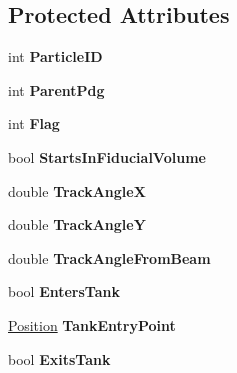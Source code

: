 \subsection*{Protected Attributes}
\begin{DoxyCompactItemize}
\item 
\hypertarget{classMCParticle_a52ca5b486dd9ded3b7da2b77c2704f85}{
int {\bfseries ParticleID}}
\label{classMCParticle_a52ca5b486dd9ded3b7da2b77c2704f85}

\item 
\hypertarget{classMCParticle_aa60d9c88e4c168be89a8075414078e82}{
int {\bfseries ParentPdg}}
\label{classMCParticle_aa60d9c88e4c168be89a8075414078e82}

\item 
\hypertarget{classMCParticle_a74ff96a2e3f2c92d991a631dc320b343}{
int {\bfseries Flag}}
\label{classMCParticle_a74ff96a2e3f2c92d991a631dc320b343}

\item 
\hypertarget{classMCParticle_a9328c826d1ee1d615e312d25235d04a0}{
bool {\bfseries StartsInFiducialVolume}}
\label{classMCParticle_a9328c826d1ee1d615e312d25235d04a0}

\item 
\hypertarget{classMCParticle_aafb0416bfa7dfcaa14f4243d76930239}{
double {\bfseries TrackAngleX}}
\label{classMCParticle_aafb0416bfa7dfcaa14f4243d76930239}

\item 
\hypertarget{classMCParticle_aaf4a5cd3469f3d527c0ac8f4e3713c4b}{
double {\bfseries TrackAngleY}}
\label{classMCParticle_aaf4a5cd3469f3d527c0ac8f4e3713c4b}

\item 
\hypertarget{classMCParticle_af4cdfb96769ec1a40e45c4f40b9eb520}{
double {\bfseries TrackAngleFromBeam}}
\label{classMCParticle_af4cdfb96769ec1a40e45c4f40b9eb520}

\item 
\hypertarget{classMCParticle_afc38d81f454f0011d513db8dedc39d37}{
bool {\bfseries EntersTank}}
\label{classMCParticle_afc38d81f454f0011d513db8dedc39d37}

\item 
\hypertarget{classMCParticle_ad1c64ca6b80955ea88cc1014360c53fa}{
\hyperlink{classPosition}{Position} {\bfseries TankEntryPoint}}
\label{classMCParticle_ad1c64ca6b80955ea88cc1014360c53fa}

\item 
\hypertarget{classMCParticle_aa33826267b580a0e0083df6deaeb26ce}{
bool {\bfseries ExitsTank}}
\label{classMCParticle_aa33826267b580a0e0083df6deaeb26ce}


\end{DoxyCompactItemize}
